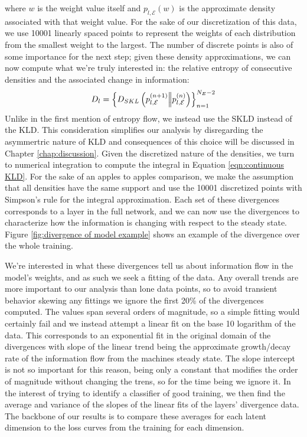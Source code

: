 where $w$ is the weight value itself and $p_{l,\mathcal{E}}(w)$ is the approximate density associated 
with that weight value. For the sake of our discretization of this data, we use 10001 linearly spaced 
points to represent the weights of each distribution from the smallest weight to the largest. The number 
of discrete points is also of some importance for the next step; given these density approximations, we 
can now compute what we're truly interested in: the relative entropy of consecutive densities and the 
associated change in information:
\begin{equation}
    D_l = \left\{D_{SKL}\left(p_{l,\mathcal{E}}^{(n+1)} \Big|\!\Big| p_{l,\mathcal{E}}^{(n)}\right)\right\}_{n=1}^{N_E-2}
\end{equation}
Unlike in the first mention of entropy flow, we instead use the SKLD instead of the KLD. This consideration
simplifies our analysis by disregarding the asymmertric nature of KLD and consequences of this choice 
will be discussed in Chapter \ref{chap:discussion}. Given the discretized nature of the densities, we turn 
to numerical integration to compute the integral in Equation \ref{eqn:continuous KLD}. For the sake of an 
apples to apples comparison, we make the assumption that all densities have the same support
and use the 10001 discretized points with Simpson's rule for the integral approximation. Each set of these
divergences corresponds to a layer in the full network, and we can now use the divergences to characterize
how the information is changing with respect to the steady state. Figure \ref{fig:divergence of model example}
shows an example of the divergence over the whole training. 

We're interested in what these divergences tell 
us about information flow in the model's weights, and as such we seek a fitting of the data. Any overall trends
are more important to our analysis than lone data points, so to avoid transient behavior skewing any fittings
we ignore the first 20\% of the divergences computed. The values span several orders of magnitude, so a simple 
fitting would certainly fail and we instead attempt a linear fit on the base 10 logarithm of the data. This 
corresponds to an exponential fit in the original domain of the divergences with slope of the linear trend 
being the approximate growth/decay rate of the information flow from the machines steady state. The slope 
intercept is not so important for this reason, being only a constant that modifies the order of magnitude 
without changing the trens, so for the time being we ignore it. In the interest of trying to identify a 
classifier of good training, we then find the average and variance of the slopes of the linear fits of 
the layers' divergence data. The backbone of our results is to compare these averages for each latent 
dimension to the loss curves from the training for each dimension.

